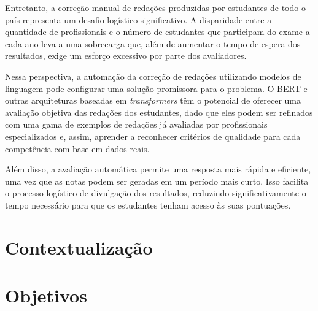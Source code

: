 Entretanto, a correção manual de redações produzidas por estudantes de todo o país representa um desafio logístico significativo. A disparidade entre a quantidade de profissionais e o número de estudantes que participam do exame a cada ano leva a uma sobrecarga que, além de aumentar o tempo de espera dos resultados, exige um esforço excessivo por parte dos avaliadores. %

Nessa perspectiva, a automação da correção de redações utilizando modelos de linguagem pode configurar uma solução promissora para o problema. O BERT e outras arquiteturas baseadas em \textit{transformers} têm o potencial de oferecer uma avaliação objetiva das redações dos estudantes, dado que eles podem ser refinados com uma gama de exemplos de redações já avaliadas por profissionais especializados e, assim, aprender a reconhecer critérios de qualidade para cada competência com base em dados reais.

Além disso, a avaliação automática permite uma resposta mais rápida e eficiente, uma vez que as notas podem ser geradas em um período mais curto. Isso facilita o processo logístico de divulgação dos resultados, reduzindo significativamente o tempo necessário para que os estudantes tenham acesso às suas pontuações.

\section{Contextualização}


\section{Objetivos}

%
